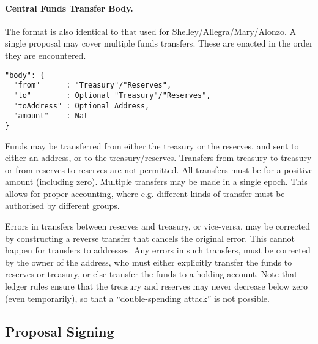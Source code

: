
\paragraph{Central Funds Transfer Body.}  The format is also identical to that used for Shelley/Allegra/Mary/Alonzo.
A single proposal may cover multiple funds transfers.  These are enacted in the order they are encountered.

\begin{verbatim}
"body": {
  "from"      : "Treasury"/"Reserves",
  "to"        : Optional "Treasury"/"Reserves",
  "toAddress" : Optional Address,
  "amount"    : Nat
}
\end{verbatim}

Funds may be transferred from either the treasury or the reserves, and sent to either an address, or to the treasury/reserves.
Transfers from treasury to treasury or from reserves to reserves are not permitted.  All transfers must be for a positive amount (including zero).
Multiple transfers may be made in a single epoch.  This allows for proper accounting, where e.g. different kinds of transfer must
be authorised by different groups.

Errors in transfers between reserves and treasury, or vice-versa, may be corrected by constructing a reverse transfer that cancels the original error.
This cannot happen for transfers to addresses.  Any errors in such transfers, must be corrected by the owner of the address, who must either explicitly transfer
the funds to reserves or treasury, or else transfer the funds to a holding account. 
Note that ledger rules ensure that the treasury and reserves may never decrease below zero (even temporarily), so that a ``double-spending attack'' is not possible.

\subsection{Proposal Signing}

